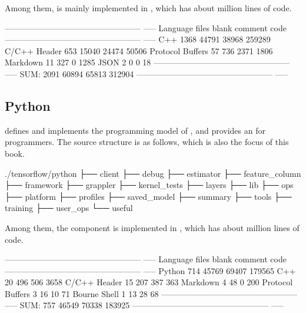 \begin{content}
Among them,  is mainly implemented in , which has about  million lines of code.

\begin{leftbar}
\begin{python}[caption={CoreCode Stats}]
-------------------------------------------------- -----
Language             files    blank   comment      code
-------------------------------------------------- -----
C++                   1368    44791     38968    259289
C/C++ Header           653    15040     24474     50506
Protocol Buffers        57      736      2371      1806
Markdown 11 327 0 1285
JSON                     2        0         0        18
-------------------------------------------------- -----
SUM:                  2091    60894     65813    312904
-------------------------------------------------- -----
\end{python}
\end{leftbar}


\subsection{Python}
 defines and implements the programming model of \tf{}, and provides an  for programmers. The source structure is as follows, which is also the focus of this book.

\begin{leftbar}
\begin{c++}[caption={Python source structure}]
./tensorflow/python
├── client
├── debug
├── estimator
├── feature_column
├── framework
├── grappler
├── kernel_tests
├── layers
├── lib
├── ops
├── platform
├── profiles
├── saved_model
├── summary
├── tools
├── training
├── user_ops
└── useful
\end{c++}
\end{leftbar}

Among them, the component is implemented in , which has about  million lines of code.

\begin{leftbar}
\begin{python}[caption={Python Code Statistics}]
-------------------------------------------------- -----
Language            files     blank   comment      code
-------------------------------------------------- -----
Python                714     45769     69407    179565
C++                    20       496       506      3658
C/C++ Header           15       207       387       363
Markdown 4 48 0 200
Protocol Buffers        3        16        10        71
Bourne Shell            1        13        28        68
-------------------------------------------------- -----
SUM:                  757     46549     70338    183925
-------------------------------------------------- -----
\end{python}
\end{leftbar}



\end{content}
